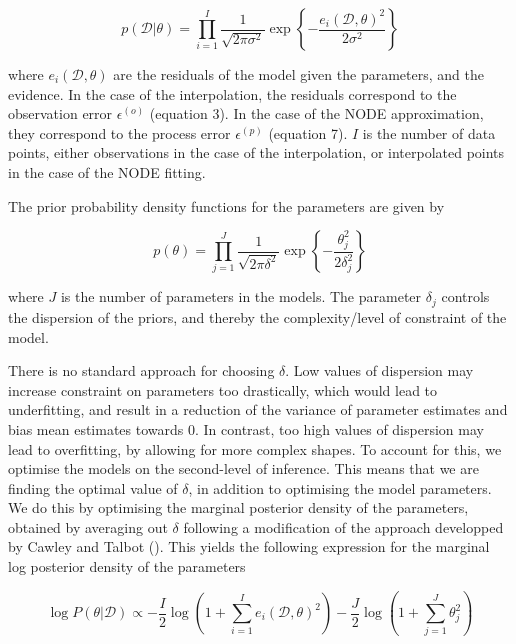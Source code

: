 \documentclass[11pt, oneside]{article}
\begin{document}
\begin{equation}
	p( \mathcal{D} | \theta) = \prod_{i=1}^{I} \frac{1}{\sqrt{2\pi\sigma^2}}  \exp \left\{ -\frac{e_i(\mathcal{D},\theta)^2}{2\sigma^2}  \right\}
\end{equation}

where $e_i(\mathcal{D},\theta)$ are the residuals of the model given the parameters, and the evidence. 
In the case of the interpolation, the residuals correspond to the observation error $\epsilon^{(o)}$ (equation 3).
In the case of the NODE approximation, they correspond to the process error $\epsilon^{(p)}$ (equation 7).
$I$ is the number of data points, either observations in the case of the interpolation, or interpolated points in the case of the NODE fitting.

The prior probability density functions for the parameters are given by

\begin{equation}
	p(\theta) = \prod_{j=1}^{J} \frac{1}{\sqrt{2\pi\delta^2}}  \exp \left\{ -\frac{\theta_j^2}{2\delta_j^2}  \right\}
\end{equation}

where $J$ is the number of parameters in the models.
The parameter $\delta_j$ controls the dispersion of the priors, and thereby the complexity/level of constraint of the model.

There is no standard approach for choosing $\delta$.
Low values of dispersion may increase constraint on parameters too drastically, which would lead to underfitting, and result in a reduction of the variance of parameter estimates and bias mean estimates towards 0.
In contrast, too high values of dispersion may lead to overfitting, by allowing for more complex shapes.
To account for this, we optimise the models on the second-level of inference.
This means that we are finding the optimal value of $\delta$, in addition to optimising the model parameters. 
We do this by optimising the marginal posterior density of the parameters, obtained by averaging out $\delta$ following a modification of the approach developped by Cawley and Talbot (\cite{Cawley2007}). 
This yields the following expression for the marginal log posterior density of the parameters 

\begin{equation}
	\log P(\theta | \mathcal{D}) \propto - \frac{I}{2} \log \left(1 + \sum_{i=1}^{I} e_i(\mathcal{D},\theta)^2\right) - \frac{J}{2} \log \left(1 + \sum_{j=1}^{J} \theta_{j}^2 \right)
\end{equation}
\end{document}
